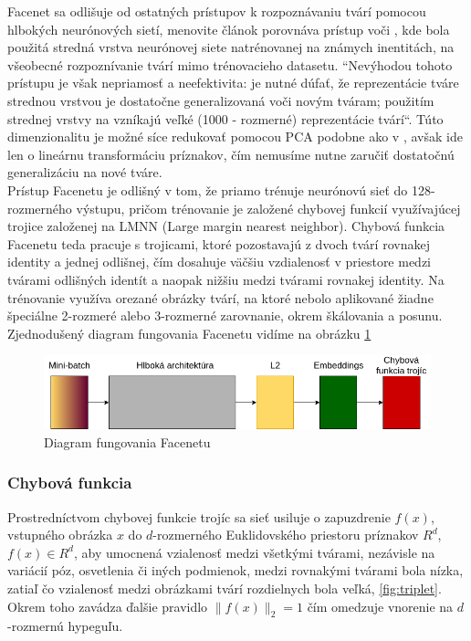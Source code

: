 \indent Facenet sa odlišuje od ostatných prístupov k rozpoznávaniu tvárí pomocou hlbokých neurónových sietí, menovite článok \cite{schroff2015facenet} porovnáva prístup voči \cite{wst2008deeply}, kde bola použitá stredná vrstva neurónovej siete natrénovanej na známych inentitách, na všeobecné rozpoznívanie tvárí mimo trénovacieho datasetu.
``Nevýhodou tohoto prístupu je však nepriamosť a neefektivita: je nutné dúfať, že reprezentácie tváre strednou vrstvou je dostatočne generalizovaná voči novým tváram; použitím strednej vrstvy na vzníkajú veľké (1000 - rozmerné) reprezentácie tvárí``\cite{schroff2015facenet}. 
Túto dimenzionalitu je možné síce redukovať pomocou PCA podobne ako v \cite{wst2008deeply}, avšak ide len o lineárnu transformáciu príznakov, čím nemusíme nutne zaručiť dostatočnú generalizáciu na nové tváre. \\

\indent Prístup Facenetu je odlišný v tom, že priamo trénuje neurónovú sieť do 128-rozmerného výstupu, pričom trénovanie je založené chybovej funkcií využívajúcej trojice založenej na LMNN (Large margin nearest neighbor)\cite{weinberger2009distance}.
Chybová funkcia Facenetu teda pracuje s trojicami, ktoré pozostavajú z dvoch tvárí rovnakej identity a jednej odlišnej, čím dosahuje väčšiu vzdialenosť v priestore medzi tvárami odlišných identít a naopak nižšiu medzi tvárami rovnakej identity.
Na trénovanie využíva orezané obrázky tvárí, na ktoré nebolo aplikované žiadne špeciálne 2-rozmeré alebo 3-rozmerné zarovnanie, okrem škálovania a posunu. \\

\indent Zjednodušený diagram fungovania Facenetu vidíme na obrázku \ref{fig:facenet}

\begin{figure}[H]
	\centering
	\includegraphics[width=1\linewidth]{img/facenet}
	\caption{Diagram fungovania Facenetu}
	\label{fig:facenet}
\end{figure}

\subsubsection{Chybová funkcia}
Prostredníctvom chybovej funkcie trojíc sa sieť usiluje o zapuzdrenie $f(x)$, vstupného obrázka $x$ do $d$-rozmerného Euklidovského priestoru príznakov $R^d$, $f(x) \in R^d$, aby umocnená vzialenosť medzi všetkými tvárami, nezávisle na variácií póz, osvetlenia či iných podmienok, medzi rovnakými tvárami bola nízka, zatiaľ čo vzialenosť medzi obrázkami tvárí rozdielnych bola veľká, \ref{fig:triplet}\cite{schroff2015facenet}.
Okrem toho zavádza ďalšie pravidlo $\parallel f(x) \parallel_{2} = 1$ čím omedzuje vnorenie na 
$d$-rozmernú hypeguľu.


